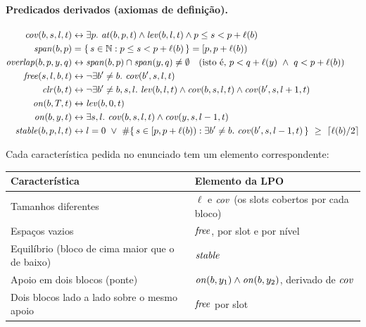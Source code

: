 \paragraph{Predicados derivados (axiomas de definição).}
\begin{align*}
\Cov(b,s,l,t)       &\leftrightarrow \exists p.\ \At(b,p,t)\land \Lev(b,l,t)\land p\le s<p+\ell(b)\\
\Span(b,p)          &= \{\,s\in\mathbb{N} : p\le s<p+\ell(b)\,\} = [p,p+\ell(b))\\
\Overlap(b,p,y,q)   &\leftrightarrow \Span(b,p)\cap\Span(y,q)\neq\emptyset
                       \quad(\text{isto é, } p<q+\ell(y)\ \land\ q<p+\ell(b))\\
\Free(s,l,b,t)      &\leftrightarrow \neg\exists b'\neq b.\ \Cov(b',s,l,t)\\
\Clr(b,t)           &\leftrightarrow \neg\exists b'\neq b,s,l.\ \Lev(b,l,t)\land\Cov(b,s,l,t)\land\Cov(b',s,l+1,t)\\
\On(b,T,t)          &\leftrightarrow \Lev(b,0,t)\\
\On(b,y,t)          &\leftrightarrow \exists s,l.\ \Cov(b,s,l,t)\land\Cov(y,s,l-1,t)\\
\Stable(b,p,l,t)    &\leftrightarrow l=0\ \lor\ \#\{\,s\in[p,p+\ell(b)) : \exists b'\neq b.\ \Cov(b',s,l-1,t)\,\}\ \ge\ \lceil \ell(b)/2\rceil
\end{align*}

Cada característica pedida no enunciado tem um elemento correspondente:
\begin{center}
\begin{tabular}{p{6.2cm} p{8cm}}
\toprule
Característica & Elemento da LPO \\
\midrule
Tamanhos diferentes & $\ell$ e $\mathit{cov}$ (os slots cobertos por cada bloco) \\
Espaços vazios & $\mathit{free}$, por slot e por nível \\
Equilíbrio (bloco de cima maior que o de baixo) & $\mathit{stable}$ \\
Apoio em dois blocos (ponte) & $\mathit{on}(b,y_1)\land\mathit{on}(b,y_2)$, derivado de $\mathit{cov}$ \\
Dois blocos lado a lado sobre o mesmo apoio & $\mathit{free}$ por slot \\
\bottomrule
\end{tabular}
\end{center}

